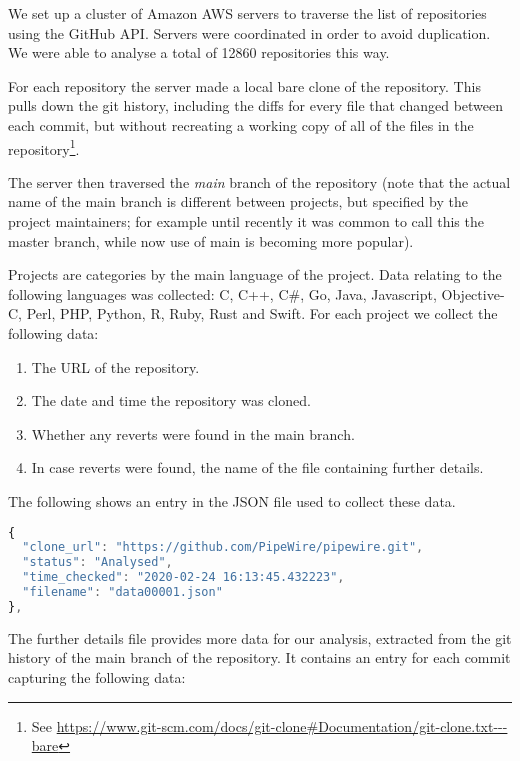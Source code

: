 \documentclass[10pt,journal,compsoc]{IEEEtran}
\begin{document}
We set up a cluster of Amazon AWS servers to traverse the list of repositories using the GitHub API. Servers were coordinated in order to avoid duplication. We were able to analyse a total of 12860 repositories this way.

For each repository the server made a local bare clone of the repository. This pulls down the git history, including the diffs for every file that changed between each commit, but without recreating a working copy of all of the files in the repository\footnote{See \url{https://www.git-scm.com/docs/git-clone#Documentation/git-clone.txt---bare}}.

The server then traversed the {\it main\/} branch of the repository (note that the actual name of the main branch is different between projects, but specified by the project maintainers; for example until recently it was common to call this the {\code master} branch, while now use of {\code main} is becoming more popular).

Projects are categories by the main language of the project. Data relating to the following languages was collected: C, C++, C\#, Go, Java, Javascript, Objective-C, Perl, PHP, Python, R, Ruby, Rust and Swift. For each project we collect the following data:

\begin{enumerate}
\item The URL of the repository.
\item The date and time the repository was cloned.
\item Whether any reverts were found in the main branch.
\item In case reverts were found, the name of the file containing further details.
\end{enumerate}

The following shows an entry in the JSON file used to collect these data.

\begin{lstlisting}[language=JavaScript]
{
  "clone_url": "https://github.com/PipeWire/pipewire.git",
  "status": "Analysed",
  "time_checked": "2020-02-24 16:13:45.432223",
  "filename": "data00001.json"
},
\end{lstlisting}

The further details file provides more data for our analysis, extracted from the git history of the main branch of the repository. It contains an entry for each commit capturing the following data:
\end{document}
